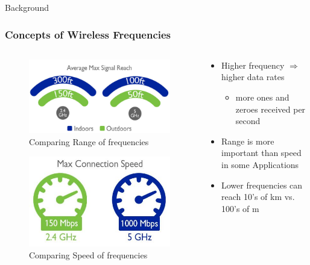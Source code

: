 \documentclass{beamer}
\begin{document}
\begin{frame}{Background}
  \frametitle{Concepts of Wireless Frequencies}
  \begin{columns}
    \begin{column}{0.5\textwidth}
        \begin{figure}[htbp]
          \centering
          \includegraphics[width=.8\textwidth, height=.20\textheight]{WiFi-frequency-reach.jpg}
          \caption{Comparing Range of frequencies\cite{WiFiFreqImOn}}
          \label{fig:WiFi-frequency-reach}
        \end{figure}
        \begin{figure}[htbp]
          \centering
          \includegraphics[width=.8\textwidth, height=.20\textheight]{WiFi-frequency-speed.jpg}
          \caption{Comparing Speed of frequencies\cite{WiFiFreqImOn}}
          \label{fig:WiFi-frequency-speed}
        \end{figure}
    \end{column}
    \begin{column}{0.5\textwidth}
          \begin{itemize}
            \item Higher frequency $\Rightarrow$ higher data rates 
              \begin{itemize}
                \item more ones and zeroes received per second
              \end{itemize}
            \item Range is more important than speed in some Applications
            \item Lower frequencies can reach 10's of km vs. 100's of m
          \end{itemize}
    \end{column}
  \end{columns}
\end{frame}
\end{document}
